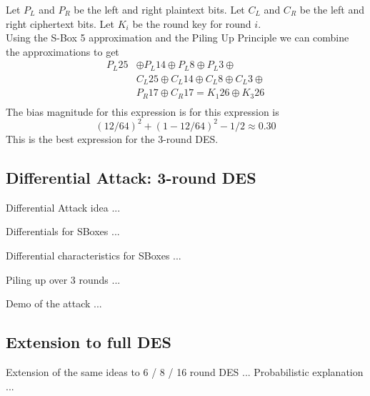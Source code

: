 \documentclass[9pt]{beamer}
\begin{document}
\begin{frame}
Let $P_L$ and $P_R$ be the left and right plaintext bits. Let $C_L$ and $C_R$ be the left and right ciphertext bits. Let $K_i$ be the round key for round $i$. \\
\vspace{5mm}
Using the S-Box 5 approximation and the Piling Up Principle we can combine the approximations to get
\begin{align*}
 P_L{25} & \oplus P_L{14} \oplus P_L{8} \oplus P_L{3} \oplus \\
         & C_L{25} \oplus C_L{14} \oplus C_L{8} \oplus C_L{3} \oplus \\
			& P_R{17} \oplus C_R{17} = K_1{26} \oplus K_3{26} \\
\end{align*}
The bias magnitude for this expression is for this expression is 
\[ (12/64)^2 + (1 - 12/64)^2 - 1/2 \approx 0.30 \]
This is the best expression for the 3-round DES.
\end{frame}

\subsection{Differential Attack: 3-round DES}
\begin{frame}
Differential Attack idea ...

\end{frame}

\begin{frame}
Differentials for SBoxes ...

\end{frame}

\begin{frame}
Differential characteristics for SBoxes ...

\end{frame}

\begin{frame}
Piling up over 3 rounds ...

\end{frame}

\begin{frame}
Demo of the attack ...

\end{frame}

\subsection{Extension to full DES}
\begin{frame}
Extension of the same ideas to 6 / 8 / 16 round DES ... Probabilistic explanation ...

\end{frame}
\end{document}
